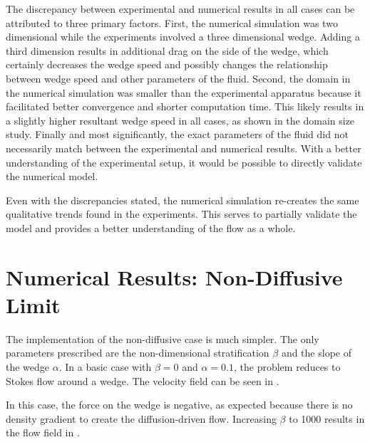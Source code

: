 \documentclass[12pt]{article}
\begin{document}
The discrepancy between experimental and numerical results in all cases can be attributed to three primary factors. First, the numerical simulation was two dimensional while the experiments involved a three dimensional wedge. Adding a third dimension results in additional drag on the side of the wedge, which certainly decreases the wedge speed and possibly changes the relationship between wedge speed and other parameters of the fluid. Second, the domain in the numerical simulation was smaller than the experimental apparatus because it facilitated better convergence and shorter computation time. This likely results in a slightly higher resultant wedge speed in all cases, as shown in the domain size study. Finally and most significantly, the exact parameters of the fluid did not necessarily match between the experimental and numerical results. With a better understanding of the experimental setup, it would be possible to directly validate the numerical model.

Even with the discrepancies stated, the numerical simulation re-creates the same qualitative trends found in the experiments. This serves to partially validate the model and provides a better understanding of the flow as a whole.

\newpage

\section{Numerical Results: Non-Diffusive Limit}

The implementation of the non-diffusive case is much simpler. The only parameters prescribed are the non-dimensional stratification $\beta$ and the slope of the wedge $\alpha$. In a basic case with $\beta=0$ and $\alpha=0.1$, the problem reduces to Stokes flow around a wedge. The velocity field can be seen in .


In this case, the force on the wedge is negative, as expected because there is no density gradient to create the diffusion-driven flow. Increasing $\beta$ to 1000 results in the flow field in .

\end{document}
